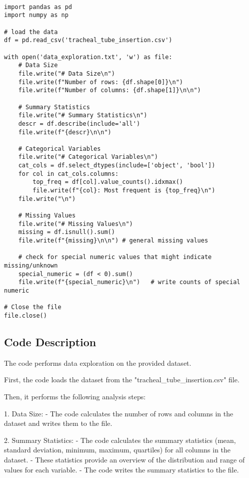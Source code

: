 \documentclass[11pt]{article}
\begin{document}
\begin{verbatim}

import pandas as pd
import numpy as np

# load the data
df = pd.read_csv('tracheal_tube_insertion.csv')

with open('data_exploration.txt', 'w') as file:
    # Data Size
    file.write("# Data Size\n")
    file.write(f"Number of rows: {df.shape[0]}\n")
    file.write(f"Number of columns: {df.shape[1]}\n\n")

    # Summary Statistics
    file.write("# Summary Statistics\n")
    descr = df.describe(include='all')
    file.write(f"{descr}\n\n")

    # Categorical Variables
    file.write("# Categorical Variables\n")
    cat_cols = df.select_dtypes(include=['object', 'bool'])
    for col in cat_cols.columns:
        top_freq = df[col].value_counts().idxmax()
        file.write(f"{col}: Most frequent is {top_freq}\n")
    file.write("\n")

    # Missing Values
    file.write("# Missing Values\n")
    missing = df.isnull().sum()
    file.write(f"{missing}\n\n") # general missing values

    # check for special numeric values that might indicate missing/unknown
    special_numeric = (df < 0).sum()      
    file.write(f"{special_numeric}\n")   # write counts of special numeric 

# Close the file
file.close()

\end{verbatim}

\subsection{Code Description}

The code performs data exploration on the provided dataset. 

First, the code loads the dataset from the "tracheal\_tube\_insertion.csv" file. 

Then, it performs the following analysis steps:

1. Data Size:
   - The code calculates the number of rows and columns in the dataset and writes them to the file. 

2. Summary Statistics:
   - The code calculates the summary statistics (mean, standard deviation, minimum, maximum, quartiles) for all columns in the dataset. 
   - These statistics provide an overview of the distribution and range of values for each variable. 
   - The code writes the summary statistics to the file. 
\end{document}
